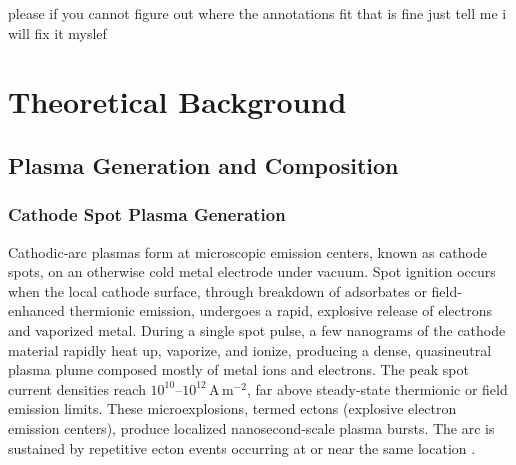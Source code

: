 



please if you cannot figure out where the annotations fit that is fine just tell me i will fix it myslef

\chapter{Theoretical Background}\label{chap:theory}

\section{Plasma Generation and Composition}

\subsection{Cathode Spot Plasma Generation}

Cathodic‐arc plasmas form at microscopic emission centers, known as cathode spots, on an otherwise cold metal electrode under vacuum. Spot ignition occurs when the local cathode surface, through breakdown of adsorbates or field-enhanced thermionic emission, undergoes a rapid, explosive release of electrons and vaporized metal. During a single spot pulse, a few nanograms of the cathode material rapidly heat up, vaporize, and ionize, producing a dense, quasineutral plasma plume composed mostly of metal ions and electrons. The peak spot current densities reach \(10^{10}\)–\(10^{12}\)\,A\,m\(^{-2}\), far above steady-state thermionic or field emission limits. These microexplosions, termed ectons (explosive electron emission centers), produce localized nanosecond-scale plasma bursts. The arc is sustained by repetitive ecton events occurring at or near the same location \cite[Chap.~3.3--3.4]{cathodic_arcs}.\\




